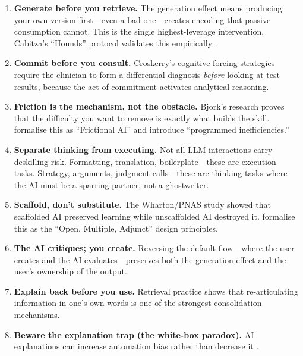 \documentclass[11pt,a4paper]{article}
\begin{document}
\begin{enumerate}
    \item \textbf{Generate before you retrieve.} The generation effect means
    producing your own version first---even a bad one---creates encoding that
    passive consumption cannot. This is the single highest-leverage intervention.
    Cabitza's ``Hounds'' protocol validates this empirically
    \citep{cabitza2023rams}.

    \item \textbf{Commit before you consult.} Croskerry's cognitive forcing
    strategies \citep{croskerry2003forcing} require the clinician to form a
    differential diagnosis \emph{before} looking at test results, because the act
    of commitment activates analytical reasoning.

    \item \textbf{Friction is the mechanism, not the obstacle.} Bjork's research
    proves that the difficulty you want to remove is exactly what builds the
    skill. \citet{cabitza2024frictional} formalise this as ``Frictional AI'' and
    \citet{cabitza2019programmed} introduce ``programmed inefficiencies.''

    \item \textbf{Separate thinking from executing.} Not all LLM interactions
    carry deskilling risk. Formatting, translation, boilerplate---these are
    execution tasks. Strategy, arguments, judgment calls---these are thinking
    tasks where the AI must be a sparring partner, not a ghostwriter.

    \item \textbf{Scaffold, don't substitute.} The Wharton/PNAS study showed
    that scaffolded AI preserved learning while unscaffolded AI destroyed it.
    \citet{cabitza2022open} formalise this as the ``Open, Multiple, Adjunct''
    design principles.

    \item \textbf{The AI critiques; you create.} Reversing the default
    flow---where the user creates and the AI evaluates---preserves both the
    generation effect and the user's ownership of the output.

    \item \textbf{Explain back before you use.} Retrieval practice shows that
    re-articulating information in one's own words is one of the strongest
    consolidation mechanisms.

    \item \textbf{Beware the explanation trap (the white-box paradox).}
    AI explanations can increase automation bias rather than decrease it
    \citep{cabitza2024explanations}.


\end{enumerate}
\end{document}
